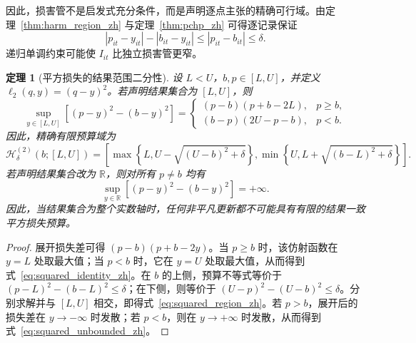 \documentclass[UTF8,11pt]{ctexart}
\newtheorem{theorem}{定理}
\newcommand{\R}{\mathbb{R}}
\begin{document}
因此，损害管不是启发式充分条件，而是声明逐点主张的精确可行域。由定理~\ref{thm:harm_region_zh} 与定理~\ref{thm:pchp_zh} 可得逐记录保证
\begin{equation}
  |p_{it}-y_{it}|-|b_{it}-y_{it}|
  \leq |p_{it}-b_{it}|\leq\delta.
  \label{eq:pointwise_harm_zh}
\end{equation}
递归单调约束可能使 $I_{it}$ 比独立损害管更窄。

\begin{theorem}[平方损失的结果范围二分性]
\label{thm:squared_geometry_zh}
设 $L<U$，$b,p\in[L,U]$，并定义 $\ell_2(q,y)=(q-y)^2$。若声明结果集合为 $[L,U]$，则
\begin{equation}
  \sup_{y\in[L,U]}\left[(p-y)^2-(b-y)^2\right]
  =
  \begin{cases}
    (p-b)(p+b-2L), & p\geq b,\\
    (b-p)(2U-p-b), & p<b.
  \end{cases}
  \label{eq:squared_identity_zh}
\end{equation}
因此，精确有限预算域为
\begin{equation}
  \mathcal H^{(2)}_{\delta}(b;[L,U])
  =\left[
  \max\!\left\{L,U-\sqrt{(U-b)^2+\delta}\right\},
  \min\!\left\{U,L+\sqrt{(b-L)^2+\delta}\right\}
  \right].
  \label{eq:squared_region_zh}
\end{equation}
若声明结果集合改为 $\R$，则对所有 $p\neq b$ 均有
\begin{equation}
  \sup_{y\in\R}\left[(p-y)^2-(b-y)^2\right]=+\infty.
  \label{eq:squared_unbounded_zh}
\end{equation}
因此，当结果集合为整个实数轴时，任何非平凡更新都不可能具有有限的结果一致平方损失预算。
\end{theorem}
\begin{proof}
展开损失差可得 $(p-b)(p+b-2y)$。当 $p\geq b$ 时，该仿射函数在 $y=L$ 处取最大值；当 $p<b$ 时，它在 $y=U$ 处取最大值，从而得到式~\eqref{eq:squared_identity_zh}。在 $b$ 的上侧，预算不等式等价于 $(p-L)^2-(b-L)^2\leq\delta$；在下侧，则等价于 $(U-p)^2-(U-b)^2\leq\delta$。分别求解并与 $[L,U]$ 相交，即得式~\eqref{eq:squared_region_zh}。若 $p>b$，展开后的损失差在 $y\to-\infty$ 时发散；若 $p<b$，则在 $y\to+\infty$ 时发散，从而得到式~\eqref{eq:squared_unbounded_zh}。
\end{proof}
\end{document}
